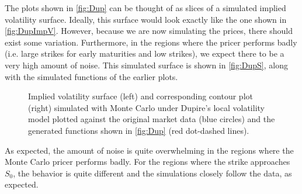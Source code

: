The plots shown in \autoref{fig:Dup} can be thought of as slices of a simulated implied volatility surface. Ideally, this surface would look exactly like the one shown in \autoref{fig:DupImpV}. However, because we are now simulating the prices, there should exist some variation. Furthermore, in the regions where the pricer performs badly (i.e. large strikes for early maturities and low strikes), we expect there to be a very high amount of noise. This simulated surface is shown in \autoref{fig:DupS}, along with the simulated functions of the earlier plots.



\begin{figure}[H]
  \begin{subfigmatrix}{2}
  \end{subfigmatrix}
    \caption[Implied volatility surface and corresponding contour plot simulated with Monte Carlo under Dupire's local volatility model plotted against the original market data and the generated functions shown in \autoref{fig:Dup}.]{Implied volatility surface (left) and corresponding contour plot (right) simulated with Monte Carlo under Dupire's local volatility model plotted against the original market data (blue circles) and the generated functions shown in \autoref{fig:Dup} (red dot-dashed lines).}\label{fig:DupS}
\end{figure}   


As expected, the amount of noise is quite overwhelming in the regions where the Monte Carlo pricer performs badly. For the regions where the strike approaches $S_0$, the behavior is quite different and the simulations closely follow the data, as expected.

\vspace{\fill}
\newpage

